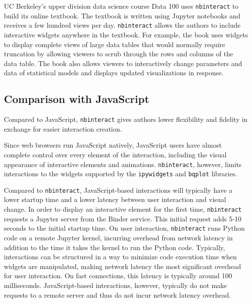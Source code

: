\documentclass[nobib]{tufte-handout}
\newcommand{\code}[1]{\texttt{#1}}
\begin{document}
UC Berkeley's upper division data science course Data 100 uses
\code{nbinteract} to build its online textbook. The textbook is written using Jupyter
notebooks and receives a few hundred views per day. \code{nbinteract} allows
the authors to include interactive widgets anywhere in the textbook. For
example, the book uses widgets to display complete views of large data tables
that would normally require truncation by allowing viewers to scrub through
the rows and columns of the data table. The book also allows viewers to
interactively change parameters and data of statistical models and displays
updated visualizations in response.


\subsection{Comparison with JavaScript} %
\label{sub:comparison_with_javascript}

Compared to JavaScript, \code{nbinteract} gives authors lower flexibility and
fidelity in exchange for easier interaction creation.

Since web browsers run JavaScript natively, JavaScript users have almost
complete control over every element of the interaction, including the visual
appearance of interactive elements and animations. \code{nbinteract}, however,
limits interactions to the widgets supported by the \code{ipywidgets} and
\code{bqplot} libraries.

Compared to \code{nbinteract}, JavaScript-based interactions will typically
have a lower startup time and a lower latency between user interaction and
visual change. In order to display an interactive element for the first time,
\code{nbinteract} requests a Jupyter server from the Binder service. This
initial request adds 5-10 seconds to the initial startup time. On user
interaction, \code{nbinteract} runs Python code on a remote Jupyter kernel,
incurring overhead from network latency in addition to the time it takes the
kernel to run the Python code. Typically, interactions can be structured in a
way to minimize code execution time when widgets are manipulated, making
network latency the most significant overhead for user interaction. On fast
connections, this latency is typically around 100 milliseconds.
JavaScript-based interactions, however, typically do not make requests to a
remote server and thus do not incur network latency overhead.
\end{document}
